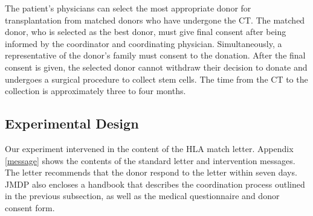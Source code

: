 \documentclass[12pt, a4paper]{article}
\begin{document}
The patient's physicians can select the most appropriate donor for transplantation from matched donors who have undergone the CT. The matched donor, who is selected as the best donor, must give final consent after being informed by the coordinator and coordinating physician. Simultaneously, a representative of the donor's family must consent to the donation. After the final consent is given, the selected donor cannot withdraw their decision to donate and undergoes a surgical procedure to collect stem cells. The time from the CT to the collection is approximately three to four months.

\hypertarget{design}{%
\subsection{Experimental Design}\label{design}}

Our experiment intervened in the content of the HLA match letter. Appendix \ref{message} shows the contents of the standard letter and intervention messages. The letter recommends that the donor respond to the letter within seven days. JMDP also encloses a handbook that describes the coordination process outlined in the previous subsection, as well as the medical questionnaire and donor consent form.
\end{document}

